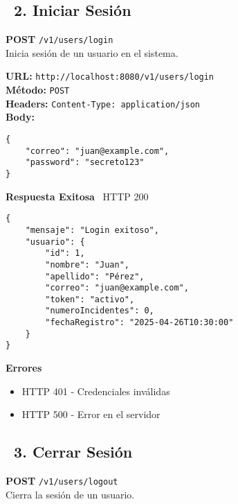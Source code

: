 \newpage

\subsection*{\faServer\ 2. Iniciar Sesión}
\begin{tcolorbox}[endpoint]
    \textbf{POST} \texttt{/v1/users/login}\\
    Inicia sesión de un usuario en el sistema.
\end{tcolorbox}

\begin{tcolorbox}[request]
    \textbf{URL:} \textcolor{urlColor}{\texttt{http://localhost:8080/v1/users/login}}\\
    \textbf{Método:} \textcolor{methodColor}{\texttt{POST}}\\
    \textbf{Headers:} \textcolor{headerColor}{\texttt{Content-Type: application/json}}\\
    \textbf{Body:}
    \begin{verbatim}
{
    "correo": "juan@example.com",
    "password": "secreto123"
}
    \end{verbatim}
\end{tcolorbox}

\begin{tcolorbox}[response]
    \textbf{Respuesta Exitosa} \faCheckCircle\ \textcolor{successColor}{HTTP 200}
    \begin{verbatim}
{
    "mensaje": "Login exitoso",
    "usuario": {
        "id": 1,
        "nombre": "Juan",
        "apellido": "Pérez",
        "correo": "juan@example.com",
        "token": "activo",
        "numeroIncidentes": 0,
        "fechaRegistro": "2025-04-26T10:30:00"
    }
}
    \end{verbatim}
    \textbf{Errores}
    \begin{itemize}
        \item \textcolor{errorColor}{HTTP 401} - Credenciales inválidas
        \item \textcolor{errorColor}{HTTP 500} - Error en el servidor
    \end{itemize}
\end{tcolorbox}

\newpage

\subsection*{\faServer\ 3. Cerrar Sesión}
\begin{tcolorbox}[endpoint]
    \textbf{POST} \texttt{/v1/users/logout}\\
    Cierra la sesión de un usuario.
\end{tcolorbox}

